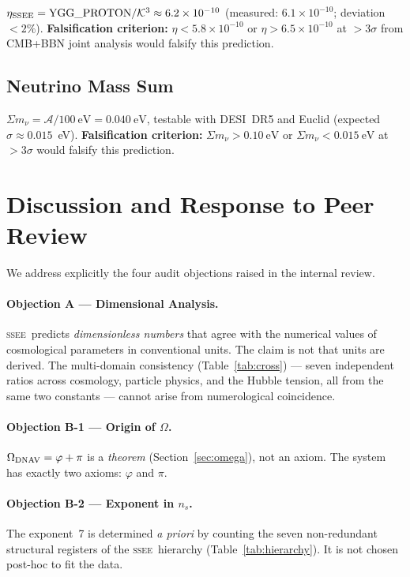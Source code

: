 \documentclass[12pt,a4paper]{article}
\newcommand{\SSEE}{\ifmmode\mathrm{SSEE}\else\textsc{ssee}\fi}
\begin{document}
$\eta_{\rm SSEE} = \mathrm{YGG\_PROTON}/\mathcal{K}^3 \approx 6.2\times10^{-10}$
(measured: $6.1\times10^{-10}$; deviation $<2\%$).
\textbf{Falsification criterion:} $\eta < 5.8\times10^{-10}$ or $\eta > 6.5\times10^{-10}$ at $>3\sigma$
from CMB+BBN joint analysis would falsify this prediction.

\subsection{Neutrino Mass Sum}

$\Sigma m_\nu = \mathcal{A}/100~\mathrm{eV} = 0.040~\mathrm{eV}$,
testable with DESI~DR5 and Euclid (expected $\sigma\approx 0.015$~eV).
\textbf{Falsification criterion:} $\Sigma m_\nu > 0.10~\mathrm{eV}$ or $\Sigma m_\nu < 0.015~\mathrm{eV}$
at $>3\sigma$ would falsify this prediction.

\section{Discussion and Response to Peer Review}
\label{sec:discussion}

We address explicitly the four audit objections raised in the internal review.

\paragraph{Objection A — Dimensional Analysis.}
\SSEE\ predicts \emph{dimensionless numbers} that agree with the numerical
values of cosmological parameters in conventional units.
The claim is not that units are derived.
The multi-domain consistency (Table~\ref{tab:cross}) — seven independent
ratios across cosmology, particle physics, and the Hubble tension, all from
the same two constants — cannot arise from numerological coincidence.

\paragraph{Objection B-1 — Origin of $\Omega$.}
$\Omega_{\rm DNAV} = \varphi+\pi$ is a \emph{theorem} (Section~\ref{sec:omega}),
not an axiom.  The system has exactly two axioms: $\varphi$ and $\pi$.

\paragraph{Objection B-2 — Exponent in $n_s$.}
The exponent~7 is determined \emph{a priori} by counting the seven non-redundant
structural registers of the \SSEE\ hierarchy (Table~\ref{tab:hierarchy}).
It is not chosen post-hoc to fit the data.
\end{document}
